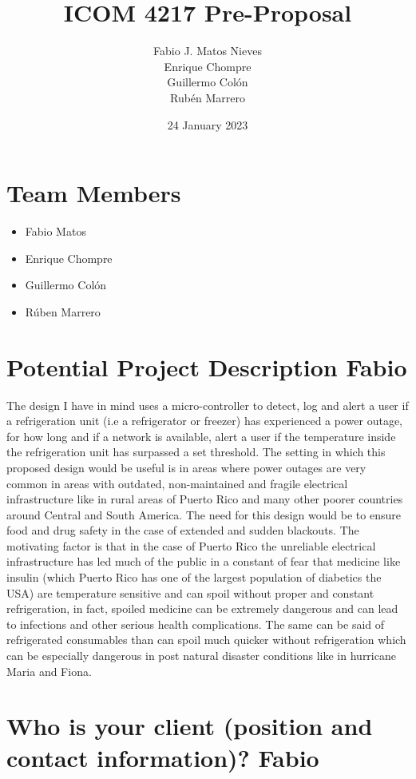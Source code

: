 \documentclass[12pt]{article}
\title{ICOM 4217 Pre-Proposal}
\author{Fabio J. Matos Nieves\\
  Enrique Chompre\\
  Guillermo Colón\\
Rubén Marrero}
\date{24 January 2023}
\begin{document}
\maketitle
\newpage
\thispagestyle{empty}
\pagestyle{plain}
\section{Team Members}
\begin{itemize}
  \item Fabio Matos
  \item Enrique Chompre
  \item Guillermo Colón
  \item Rúben Marrero
\end{itemize} 
\newpage
\section{Potential Project Description Fabio}
The design I have in mind uses a micro-controller to detect, log and alert a user if a refrigeration unit (i.e a refrigerator or freezer) has experienced a power outage, for how long and if a network is available, alert a user if the temperature inside the refrigeration unit has surpassed a set threshold. The setting in which this proposed design would be useful is in areas where power outages are very common in areas with outdated, non-maintained and fragile electrical infrastructure like in rural areas of Puerto Rico and many other poorer countries around Central and South America. The need for this design would be to ensure food and drug safety in the case of extended and sudden blackouts. The motivating factor is that in the case of Puerto Rico the unreliable electrical infrastructure has led much of the public in a constant of fear that medicine like insulin (which Puerto Rico has one of the largest population of diabetics the USA) are temperature sensitive and can spoil without proper and constant refrigeration, in fact, spoiled medicine can be extremely dangerous and can lead to infections and other serious health complications. The same can be said of refrigerated consumables than can spoil much quicker without refrigeration which can be especially dangerous in post natural disaster conditions like in hurricane Maria and Fiona.
\newpage
\section{Who is your client (position and contact information)? Fabio}
\end{document}
